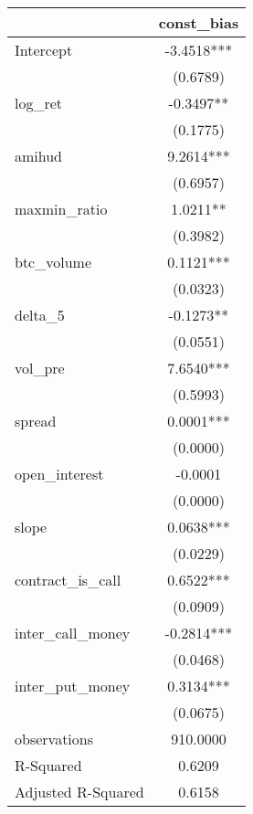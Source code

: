 \begin{tabular}{lc}
\hline
                   & const\_bias  \\
\midrule
\midrule
Intercept          & -3.4518***   \\
                   & (0.6789)     \\
log\_ret           & -0.3497**    \\
                   & (0.1775)     \\
amihud             & 9.2614***    \\
                   & (0.6957)     \\
maxmin\_ratio      & 1.0211**     \\
                   & (0.3982)     \\
btc\_volume        & 0.1121***    \\
                   & (0.0323)     \\
delta\_5           & -0.1273**    \\
                   & (0.0551)     \\
vol\_pre           & 7.6540***    \\
                   & (0.5993)     \\
spread             & 0.0001***    \\
                   & (0.0000)     \\
open\_interest     & -0.0001      \\
                   & (0.0000)     \\
slope              & 0.0638***    \\
                   & (0.0229)     \\
contract\_is\_call & 0.6522***    \\
                   & (0.0909)     \\
inter\_call\_money & -0.2814***   \\
                   & (0.0468)     \\
inter\_put\_money  & 0.3134***    \\
                   & (0.0675)     \\
observations       & 910.0000     \\
R-Squared          & 0.6209       \\
Adjusted R-Squared & 0.6158       \\
\hline
\end{tabular}